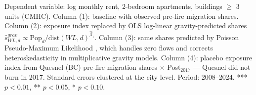 \begin{table}[htbp]
   \par \raggedright 
   Dependent variable: log monthly rent, 2-bedroom apartments, buildings $\geq$ 3 units (CMHC). Column (1): baseline with observed pre-fire migration shares. Column (2): exposure index replaced by OLS log-linear gravity-predicted shares $\hat{s}_{WL,d}^{grav} \propto \text{Pop}_d / \text{dist}(WL,d)^{\hat{\beta}_1}$. Column (3): same shares predicted by Poisson Pseudo-Maximum Likelihood \citep{santossilva2006}, which handles zero flows and corrects heteroskedasticity in multiplicative gravity models. Column (4): placebo exposure index from Quesnel (BC) pre-fire migration shares $\times$ Post$_{2017}$ --- Quesnel did not burn in 2017. Standard errors clustered at the city level. Period: 2008--2024. *** $p<0.01$, ** $p<0.05$, * $p<0.10$.
\end{table}
